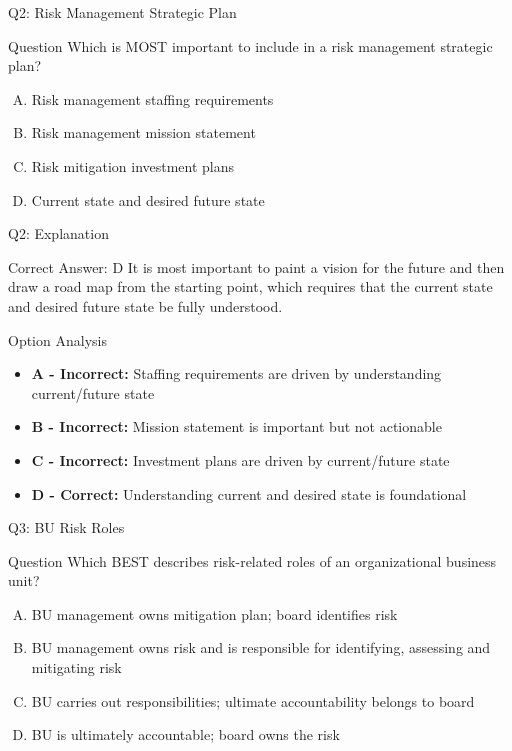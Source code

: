 \documentclass{beamer}
\begin{document}
	\begin{frame}{Q2: Risk Management Strategic Plan}
		\begin{block}{Question}
			Which is MOST important to include in a risk management strategic plan?
		\end{block}
		\begin{enumerate}[(A)]
			\item Risk management staffing requirements
			\item Risk management mission statement
			\item Risk mitigation investment plans
			\item Current state and desired future state
		\end{enumerate}
	\end{frame}
	
	\begin{frame}{Q2: Explanation}
		\begin{block}{Correct Answer: D}
			It is most important to paint a vision for the future and then draw a road map from the starting point, which requires that the current state and desired future state be fully understood.
		\end{block}
		\begin{block}{Option Analysis}
			\begin{itemize}
				\item \textbf{A - Incorrect:} Staffing requirements are driven by understanding current/future state
				\item \textbf{B - Incorrect:} Mission statement is important but not actionable
				\item \textbf{C - Incorrect:} Investment plans are driven by current/future state
				\item \textbf{D - Correct:} Understanding current and desired state is foundational
			\end{itemize}
		\end{block}
	\end{frame}
	
	\begin{frame}{Q3: BU Risk Roles}
		\begin{block}{Question}
			Which BEST describes risk-related roles of an organizational business unit?
		\end{block}
		\begin{enumerate}[(A)]
			\item BU management owns mitigation plan; board identifies risk
			\item BU management owns risk and is responsible for identifying, assessing and mitigating risk
			\item BU carries out responsibilities; ultimate accountability belongs to board
			\item BU is ultimately accountable; board owns the risk
		\end{enumerate}
	\end{frame}
	
\end{document}
